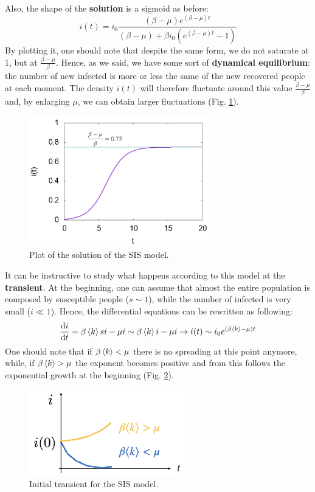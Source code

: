 \documentclass[../main/main.tex]{subfiles}
\begin{document}
Also, the shape of the \textbf{solution} is a sigmoid as before:
\begin{equation}
  i(t) = i_0 \frac{(\beta - \mu ) e^{(\beta - \mu )t} }{(\beta - \mu)  + \beta i_0 (e^{(\beta - \mu )t} - 1) }
\end{equation}
By plotting it, one should note that despite the same form, we do not saturate at 1, but at $ \frac{\beta - \mu }{\beta } $. Hence, as we said, we have some sort of \textbf{dynamical equilibrium}: the number of new infected is more or less the same of the new recovered people at each moment. The density $i(t)$ will therefore fluctuate around this value $\frac{\beta - \mu }{\beta }$ and, by enlarging \( \mu  \), we can obtain larger fluctuations (Fig. \ref{fig:3_3}).
\begin{figure}[h!]
\centering
\includegraphics[width=0.7\textwidth]{../lessons/image/03/3.png}
\caption{\label{fig:3_3} Plot of the solution of the SIS model.}
\end{figure}

It can be instructive to study what happens according to this model at the \textbf{transient}. At the beginning, one can assume that almost the entire population is composed by susceptible  people ($ s \sim 1 $), while the number of infected is very small ($ i \ll 1 $).
Hence, the differential equations can be rewritten as following:
\begin{equation*}
  \dv{i}{t} = \beta \expval{k} s i - \mu i \sim \beta \expval{k} i - \mu i \rightarrow i(t) \sim i_0 e^{(\beta \expval{k} - \mu  )t}
\end{equation*}
One should note that if \( \beta \expval{k} < \mu   \) there is no spreading at this point anymore, while, if \( \beta \expval{k} > \mu   \) the exponent becomes positive and from this follows the exponential growth at the beginning (Fig. \ref{fig:3_4}).

\begin{figure}[h!]
\centering
\includegraphics[width=0.6\textwidth]{../lessons/image/03/4.png}
\caption{\label{fig:3_4} Initial transient for the SIS model.}
\end{figure}
\end{document}
